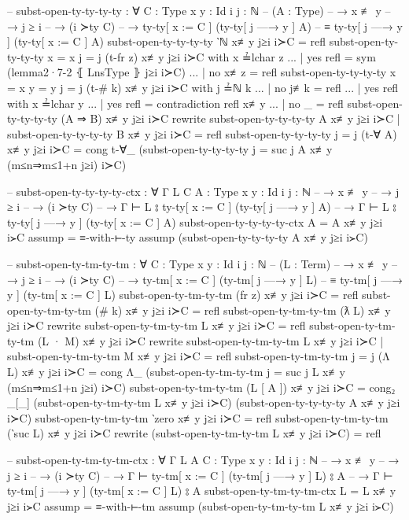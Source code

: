 \documentclass[logo,bsc,singlespacing,parskip,online]{infthesis}
\renewenvironment{code}{\mintedcopy[breaklines,breaksymbolleft=\;]{agda}}{\endmintedcopy}
\begin{document}
\begin{code}
  -- subst-open-ty-ty-ty-ty : ∀ {C : Type} {x y : Id} {i j : ℕ}
  --   (A : Type)
  --   → x ≢ y
  --   → j ≥ i
  --   → (i ≻ty C)
  --   → ty-ty[ x := C ] (ty-ty[ j —→ y ] A)
  --     ≡ ty-ty[ j —→ y ] (ty-ty[ x := C ] A)
  subst-open-ty-ty-ty-ty ‵ℕ x≢y j≥i i≻C = refl
  subst-open-ty-ty-ty-ty {x = x} {j = j} (t-fr z) x≢y j≥i i≻C with x ≟lchar z
  ... | yes refl = sym (lemma2·7-2 ⦃ LnsType ⦄ j≥i i≻C)
  ... | no  x≢z  = refl
  subst-open-ty-ty-ty-ty {x = x} {y = y} {j = j} (t-# k) x≢y j≥i i≻C with j ≟ℕ k
  ... | no  j≢k  = refl
  ... | yes refl with x ≟lchar y
  ...   | yes refl = contradiction refl x≢y
  ...   | no  _    = refl
  subst-open-ty-ty-ty-ty (A ⇒ B) x≢y j≥i i≻C rewrite
      subst-open-ty-ty-ty-ty A x≢y j≥i i≻C
    | subst-open-ty-ty-ty-ty B x≢y j≥i i≻C
    = refl
  subst-open-ty-ty-ty-ty {j = j} (t-∀ A) x≢y j≥i i≻C = cong t-∀_
    (subst-open-ty-ty-ty-ty {j = suc j} A x≢y (m≤n⇒m≤1+n j≥i) i≻C)

  -- subst-open-ty-ty-ty-ty-ctx : ∀ {Γ L} {C A : Type} {x y : Id} {i j : ℕ}
  --   → x ≢ y
  --   → j ≥ i
  --   → (i ≻ty C)
  --   → Γ ⊢ L ⦂ ty-ty[ x := C ] (ty-ty[ j —→ y ] A)
  --   → Γ ⊢ L ⦂ ty-ty[ j —→ y ] (ty-ty[ x := C ] A)
  subst-open-ty-ty-ty-ty-ctx {A = A} x≢y j≥i i≻C assump = ≡-with-⊢-ty assump (subst-open-ty-ty-ty-ty A x≢y j≥i i≻C)

  -- subst-open-ty-tm-ty-tm : ∀ {C : Type} {x y : Id} {i j : ℕ}
  --   (L : Term)
  --   → x ≢ y
  --   → j ≥ i
  --   → (i ≻ty C)
  --   → ty-tm[ x := C ] (ty-tm[ j —→ y ] L)
  --     ≡ ty-tm[ j —→ y ] (ty-tm[ x := C ] L)
  subst-open-ty-tm-ty-tm (fr z) x≢y j≥i i≻C = refl
  subst-open-ty-tm-ty-tm (# k) x≢y j≥i i≻C = refl
  subst-open-ty-tm-ty-tm (ƛ L) x≢y j≥i i≻C rewrite
    subst-open-ty-tm-ty-tm L x≢y j≥i i≻C = refl
  subst-open-ty-tm-ty-tm (L · M) x≢y j≥i i≻C rewrite
      subst-open-ty-tm-ty-tm L x≢y j≥i i≻C
    | subst-open-ty-tm-ty-tm M x≢y j≥i i≻C
    = refl
  subst-open-ty-tm-ty-tm {j = j} (Λ L) x≢y j≥i i≻C = cong Λ_
    (subst-open-ty-tm-ty-tm {j = suc j} L x≢y (m≤n⇒m≤1+n j≥i) i≻C)
  subst-open-ty-tm-ty-tm (L [ A ]) x≢y j≥i i≻C = cong₂ _[_]
    (subst-open-ty-tm-ty-tm L x≢y j≥i i≻C)
    (subst-open-ty-ty-ty-ty A x≢y j≥i i≻C)
  subst-open-ty-tm-ty-tm ‵zero x≢y j≥i i≻C = refl
  subst-open-ty-tm-ty-tm (‵suc L) x≢y j≥i i≻C rewrite
    (subst-open-ty-tm-ty-tm L x≢y j≥i i≻C) = refl

  -- subst-open-ty-tm-ty-tm-ctx : ∀ {Γ L A} {C : Type} {x y : Id} {i j : ℕ}
  --   → x ≢ y
  --   → j ≥ i
  --   → (i ≻ty C)
  --   → Γ ⊢ ty-tm[ x := C ] (ty-tm[ j —→ y ] L) ⦂ A
  --   → Γ ⊢ ty-tm[ j —→ y ] (ty-tm[ x := C ] L) ⦂ A
  subst-open-ty-tm-ty-tm-ctx {L = L} x≢y j≥i i≻C assump = ≡-with-⊢-tm assump (subst-open-ty-tm-ty-tm L x≢y j≥i i≻C)
\end{code}
\end{document}
